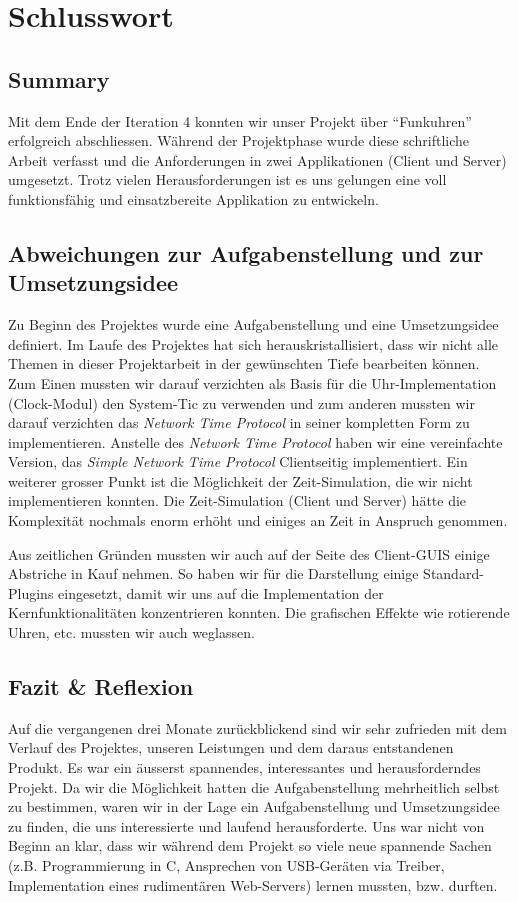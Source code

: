 
\chapter{Schlusswort}
\label{chap:Schlusswort}

\section{Summary}
Mit dem Ende der Iteration 4 konnten wir unser Projekt über "`Funkuhren"' erfolgreich abschliessen. Während der Projektphase wurde diese schriftliche Arbeit verfasst und die Anforderungen in zwei Applikationen (Client und Server) umgesetzt. Trotz vielen Herausforderungen ist es uns gelungen eine voll funktionsfähig und einsatzbereite Applikation zu entwickeln.

\section{Abweichungen zur Aufgabenstellung und zur Umsetzungsidee}
Zu Beginn des Projektes wurde eine Aufgabenstellung und eine Umsetzungsidee definiert. Im Laufe des Projektes hat sich herauskristallisiert, dass wir nicht alle Themen in dieser Projektarbeit in der gewünschten Tiefe bearbeiten können. Zum Einen mussten wir darauf verzichten als Basis für die Uhr-Implementation (Clock-Modul) den System-Tic zu verwenden und zum anderen mussten wir darauf verzichten das \textit{Network Time Protocol} in seiner kompletten Form zu implementieren. Anstelle des \textit{Network Time Protocol} haben wir eine vereinfachte Version, das \textit{Simple Network Time Protocol} Clientseitig implementiert. Ein weiterer grosser Punkt ist die Möglichkeit der Zeit-Simulation, die wir nicht implementieren konnten. Die Zeit-Simulation (Client und Server) hätte die Komplexität nochmals enorm erhöht und einiges an Zeit in Anspruch genommen.

Aus zeitlichen Gründen mussten wir auch auf der Seite des Client-GUIS einige Abstriche in Kauf nehmen. So haben wir für die Darstellung einige Standard-Plugins eingesetzt, damit wir uns auf die Implementation der Kernfunktionalitäten konzentrieren konnten. Die grafischen Effekte wie rotierende Uhren, etc. mussten wir auch weglassen.


\section{Fazit & Reflexion}
Auf die vergangenen drei Monate zurückblickend sind wir sehr zufrieden mit dem Verlauf des Projektes, unseren Leistungen und dem daraus entstandenen Produkt. Es war ein äusserst spannendes, interessantes und herausforderndes Projekt. Da wir die Möglichkeit hatten die Aufgabenstellung mehrheitlich selbst zu bestimmen, waren wir in der Lage ein Aufgabenstellung und Umsetzungsidee zu finden, die uns interessierte und laufend herausforderte. Uns war nicht von Beginn an klar, dass wir während dem Projekt so viele neue spannende Sachen (z.B. Programmierung in C, Ansprechen von USB-Geräten via Treiber, Implementation eines rudimentären Web-Servers) lernen mussten, bzw. durften.

